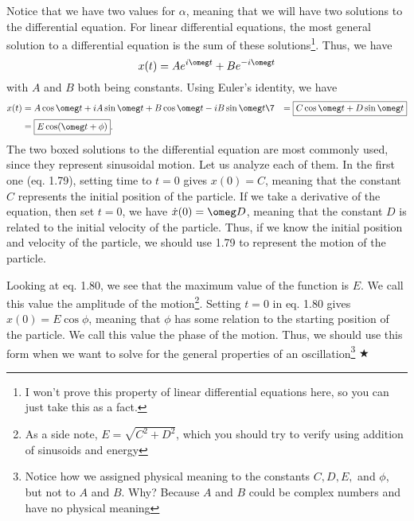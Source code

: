 \noindent Notice that we have two values for $\alpha$, meaning that we will have two solutions to the differential equation. For linear differential equations, the most general solution to a differential equation is the sum of these solutions\footnote{I won't prove this property of linear differential equations here, so you can just take this as a fact.}. Thus, we have 
\begin{equation}
    x(t) = Ae^{i\omeg t}+Be^{-i\omeg t}
\end{equation}
\noindent with $A$ and $B$ both being constants. Using Euler's identity, we have 
\begin{align}
    x(t) &= A\cos \omeg t + iA\sin\omeg t + B\cos \omeg t - iB\sin\omeg t\7
    &= \boxed{C\cos \omeg t + D\sin \omeg t} \\
    &= \boxed{E\cos(\omeg t + \phi)}.
\end{align}
\noindent The two boxed solutions to the differential equation are most commonly used, since they represent sinusoidal motion. Let us analyze each of them. In the first one (eq. 1.79), setting time to $t=0$ gives $x(0) = C$, meaning that the constant $C$ represents the initial position of the particle. If we take a derivative of the equation, then set $t=0$, we have $\dot{x}(0) = \omeg D$, meaning that the constant $D$ is related to the initial velocity of the particle. Thus, if we know the initial position and velocity of the particle, we should use 1.79 to represent the motion of the particle. 

\noindent Looking at eq. 1.80, we see that the maximum value of the function is $E$. We call this value the amplitude of the motion\footnote{As a side note, $E = \sqrt{C^2 + D^2}$, which you should try to verify using addition of sinusoids and energy}. Setting $t=0$ in eq. 1.80 gives $x(0) = E\cos \phi$, meaning that $\phi$ has some relation to the starting position of the particle. We call this value the phase of the motion. Thus, we should use this form when we want to solve for the general properties of an oscillation\footnote{Notice how we assigned physical meaning to the constants $C, D, E,$ and $\phi$, but not to $A$ and $B$. Why? Because $A$ and $B$ could be complex numbers and have no physical meaning} $\bigstar$ 

%
%
